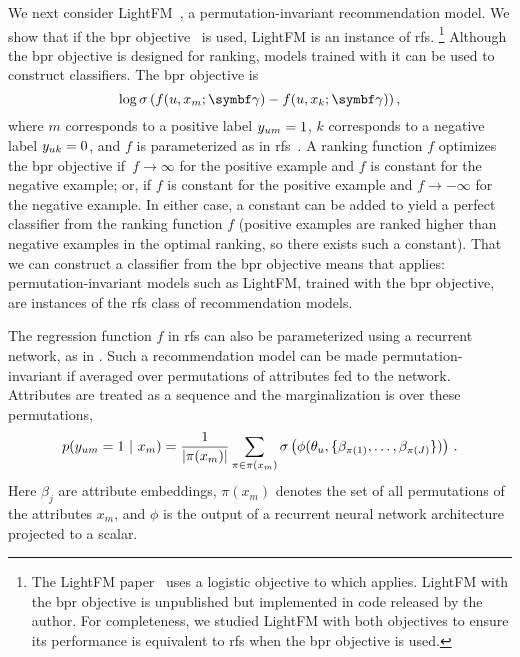 We next consider LightFM~\citep{kula2015metadata}, a permutation-invariant recommendation model. We show that if the \gls{bpr} objective~\citep{rendle2009bpr:} is used, LightFM is an instance of \acrshort{rfs}. \footnote{The LightFM paper~\citep{kula2015metadata} uses a logistic objective to which  applies. LightFM with the \gls{bpr} objective is unpublished but implemented in code released by the author. For completeness, we studied LightFM with both objectives to ensure its performance is equivalent to \gls{rfs} when the \gls{bpr} objective is used.} Although the \gls{bpr} objective is designed for ranking, models trained with it can be used to construct classifiers. The \gls{bpr} objective is
$${\log\sigma\left(f(u, x_m; \mbgamma) - f(u, x_k; \mbgamma)\right)}\, ,$$
where $m$ corresponds to a positive label $y_{um} = 1$, $k$ corresponds to a negative label $y_{uk} = 0$, and $f$ is parameterized as in \gls{rfs}~\citep{kula2015metadata}. A ranking function $f$ optimizes the \gls{bpr} objective if~${f\rightarrow \infty}$ for the positive example and $f$ is constant for the negative example; or, if $f$ is constant for the positive example and $f\rightarrow -\infty$ for the negative example. In either case, a constant can be added to yield a perfect classifier from the ranking function $f$ (positive examples are ranked higher than negative examples in the optimal ranking, so there exists such a constant). That we can construct a classifier from the \gls{bpr} objective means that  applies: permutation-invariant models such as LightFM, trained with the \gls{bpr} objective, are instances of the \gls{rfs} class of recommendation models.

The regression function $f$ in \gls{rfs} can also be parameterized using a recurrent network, as in \citet{bansal2016ask-the-gru:}. Such a recommendation model can be made permutation-invariant if averaged over permutations of attributes fed to the network. Attributes are treated as a sequence and the marginalization is over these permutations,
\begin{equation}
p(y_{um} = 1 ~\vert~ x_m) =
  \frac{1}{\lvert \pi(x_m) \rvert}\sum_{\pi \in \pi(x_m)}\sigma\left(\phi(\theta_u,\{\beta_{\pi(1)}, \ldots,
  \beta_{\pi(J)}\})\right) \, .
\label{eq:rnn}
\end{equation}
Here $\beta_j$ are attribute embeddings, $\pi(x_m)$ denotes the set of all permutations of the attributes $x_m$, and $\phi$ is the output of a recurrent neural network architecture~\citep{bansal2016ask-the-gru:} projected to a scalar.